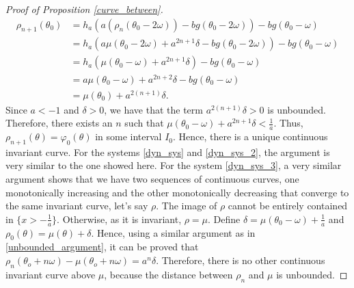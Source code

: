 \documentclass[12pt]{article}
\theoremstyle{plain}
\theoremstyle{remark}
\theoremstyle{definition}
\begin{document}
\begin{proof}[Proof of Proposition \ref{curve_between}]
\begin{align}
        \rho_{n+1}(\theta_0) &= h_a(a(\rho_n(\theta_0-2\omega)) - b g(\theta_0-2\omega)) - b g(\theta_0-\omega) \nonumber\\
        &= h_a(a\mu(\theta_0-2\omega) + a^{2n+1}\delta - b g(\theta_0-2\omega)) - b g(\theta_0-\omega) \nonumber\\
        &= h_a(\mu(\theta_0-\omega) +a^{2n+1}\delta) - b g(\theta_0-\omega) \nonumber\\
        &= a\mu(\theta_0-\omega) + a^{2n+2}\delta - b g(\theta_0-\omega) \nonumber\\
        &= \mu(\theta_0) + a^{2(n+1)}\delta. \label{unbounded_argument}
    \end{align}
    Since $a<-1$ and $\delta>0$, we have that the term $a^{2(n+1)}\delta>0$ is unbounded.
    Therefore, there exists an $n$ such that $\mu(\theta_0-\omega) + a^{2n+1}\delta < \frac{1}{a}$. Thus, $\rho_{n+1}(\theta)=\varphi_0(\theta)$ in some interval $I_0$. Hence, there is a unique continuous invariant curve. For the systems \eqref{dyn_sys} and \eqref{dyn_sys_2}, the argument is very similar to the one showed here. For the system \eqref{dyn_sys_3}, a very similar argument shows that we have two sequences of continuous curves, one monotonically increasing and the other monotonically decreasing that converge to the same invariant curve, let's say $\rho$. The image of $\rho$ cannot be entirely contained in $\{x>-\frac{1}{a}\}$. Otherwise, as it is invariant, $\rho=\mu$. Define $\delta=\mu(\theta_0-\omega)+\frac{1}{a}$ and $\rho_0(\theta)=\mu(\theta)+\delta$. Hence, using a similar argument as in \eqref{unbounded_argument}, it can be proved that $\rho_n(\theta_o+n\omega)-\mu(\theta_o+n\omega)=a^n\delta$. Therefore, there is no other continuous invariant curve above $\mu$, because the distance between $\rho_n$ and $\mu$ is unbounded. 
\end{proof}
\end{document}
